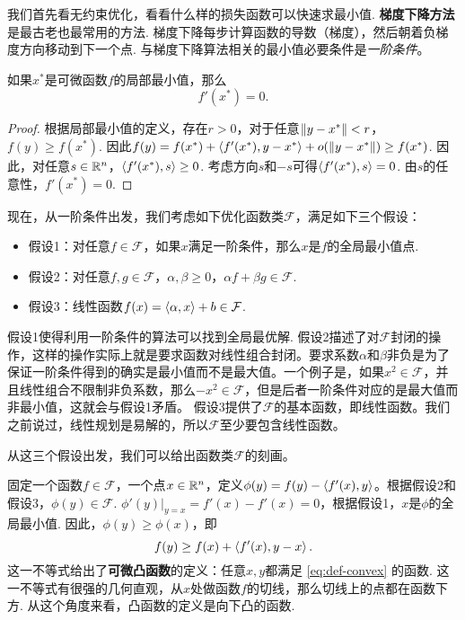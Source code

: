我们首先看无约束优化，看看什么样的损失函数可以快速求最小值. \textbf{梯度下降方法}是最古老也最常用的方法. 梯度下降每步计算函数的导数（梯度），然后朝着负梯度方向移动到下一个点. 与梯度下降算法相关的最小值必要条件是\emph{一阶条件}。

\begin{theorem}[一阶条件]
    如果$x^*$是可微函数$f$的局部最小值，那么
    \[f'(x^*)=0.\]
\end{theorem}

\begin{proof}
根据局部最小值的定义，存在$r>0$，对于任意$\left\|y-x^*\right\|<r$，$f(y)\geq f(x^*)$. 因此$f(y)=f(x^*)+\left\langle{f'(x^*)},{y-x^*}\right\rangle+o(\left\|y-x^*\right\|)\geq f(x^*)$. 因此，对任意$s\in\mathbb{R}^n$，$\left\langle{f'(x^*)},{s}\right\rangle\geq 0$. 考虑方向$s$和$-s$可得$\left\langle{f'(x^*)},{s}\right\rangle=0$. 由$s$的任意性，$f'(x^*)=0$.
\end{proof}

\renewcommand{\F}{\mathcal{F}}

现在，从一阶条件出发，我们考虑如下优化函数类$\F$，满足如下三个假设：
\begin{itemize}
    \item 假设1：对任意$f\in\F$，如果$x$满足一阶条件，那么$x$是$f$的全局最小值点.
    \item 假设2：对任意$f,g\in\F$，$\alpha,\beta\geq 0$，$\alpha f+\beta g\in\F$.
    \item 假设3：线性函数$f(x)=\inner{\alpha}{x}+b\in\F$.
\end{itemize}
假设1使得利用一阶条件的算法可以找到全局最优解. 假设2描述了对$\F$封闭的操作，这样的操作实际上就是要求函数对线性组合封闭。要求系数$\alpha$和$\beta$非负是为了保证一阶条件得到的确实是最小值而不是最大值。一个例子是，如果$x^2\in\F$，并且线性组合不限制非负系数，那么$-x^2\in\F$，但是后者一阶条件对应的是最大值而非最小值，这就会与假设1矛盾。 假设3提供了$\F$的基本函数，即线性函数。我们之前说过，线性规划是易解的，所以$\F$至少要包含线性函数。

从这三个假设出发，我们可以给出函数类$\F$的刻画。

固定一个函数$f\in\F$，一个点$x\in\mathbb{R}^n$，定义$\phi(y)=f(y)-\left\langle{f'(x)},{y}\right\rangle$。根据假设2和假设3，$\phi(y)\in\F$. $\phi'(y)|_{y=x}=f'(x)-f'(x)=0$，根据假设1，$x$是$\phi$的全局最小值. 因此，$\phi(y)\geq\phi(x)$，即
\begin{equation}
    f(y)\geq f(x)+\left\langle{f'(x)},{y-x}\right\rangle.\label{eq:def-convex}
\end{equation}
这一不等式给出了\textbf{可微凸函数}的定义：任意$x,y$都满足 \eqref{eq:def-convex} 的函数. 这一不等式有很强的几何直观，从$x$处做函数$f$的切线，那么切线上的点都在函数下方. 从这个角度来看，凸函数的定义是向下凸的函数. 

